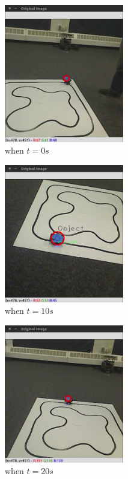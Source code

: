 \begin{figure}[htbp]
	\centering
	\begin{subfigure}{0.5\textwidth}
		\centering
		\includegraphics[height=6cm]{images/chapter2/gimbal_0s.png}
		\caption{when $t=0s$}
	\end{subfigure}%
	\begin{subfigure}{0.5\textwidth}
		\centering
		\includegraphics[height=6cm]{images/chapter2/gimbal_10s.png}
		\caption{when $t=10s$}
	\end{subfigure}
	\begin{subfigure}{0.5\textwidth}
		\centering
		\includegraphics[height=6cm]{images/chapter2/gimbal_20s.png}
		\caption{when $t=20s$}
	\end{subfigure}%
	\begin{subfigure}{0.5\textwidth}

\end{subfigure}
\end{figure}
